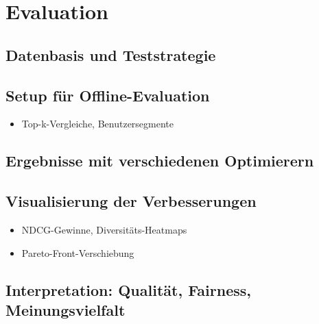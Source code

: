 \section{Evaluation}
\subsection{Datenbasis und Teststrategie}
\subsection{Setup für Offline-Evaluation}
\begin{itemize}
    \item Top-k-Vergleiche, Benutzersegmente
\end{itemize}
\subsection{Ergebnisse mit verschiedenen Optimierern}
\subsection{Visualisierung der Verbesserungen}
\begin{itemize}
    \item NDCG-Gewinne, Diversitäts-Heatmaps
    \item Pareto-Front-Verschiebung
\end{itemize}
\subsection{Interpretation: Qualität, Fairness, Meinungsvielfalt}